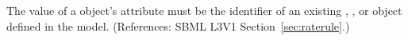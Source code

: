 The value of a \RateRule object's  attribute must be the
identifier of an existing \Compartment, \Species, \Parameter or
\SpeciesReference object defined in the model.  (References: SBML L3V1
Section~\ref{sec:raterule}.)
